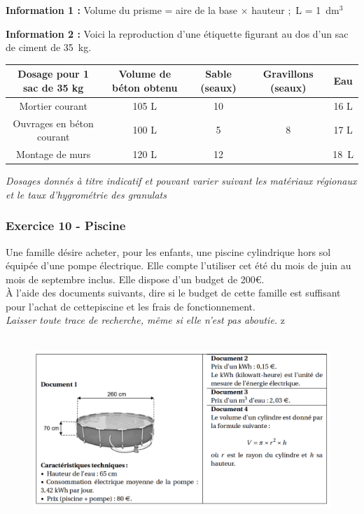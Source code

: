\documentclass[11pt]{article}
\begin{document}
\textbf{Information 1 :} Volume du prisme = aire de la base $\times$ hauteur ;~L = 1~dm$^3$

\textbf{Information 2 :} Voici la reproduction d'une étiquette figurant au dos d'un sac de ciment
de 35~kg.

\begin{center}
  \begin{tabular}{|c|c|c|c|c|}  \hline
    Dosage pour 1 sac de 35 kg	&Volume de béton obtenu	&Sable (seaux)	&Gravillons (seaux)	&Eau\\ \hline
    Mortier courant 			&105 L					&10				&					&16 L\\ \hline
    Ouvrages en béton courant	&100 L					&5				&8 					&17 L\\ \hline
    Montage de murs 			&120 L 					&12				&					&18~L\\ \hline
  \end{tabular}
\end{center}
\textit{Dosages donnés à titre indicatif et pouvant varier suivant les matériaux régionaux et le taux d'hygrométrie des granulats}

\subsubsection*{Exercice 10 - Piscine}

Une famille désire acheter, pour les enfants, une piscine cylindrique hors sol équipée d’une pompe électrique. Elle compte l’utiliser cet été du mois de juin au mois de septembre inclus. Elle dispose d’un budget de 200\euro. \\
À l’aide des documents suivants, dire si le budget de cette famille est suffisant pour l’achat de cettepiscine et les frais de fonctionnement. \\
\textit{Laisser toute trace de recherche, même si elle n’est pas aboutie.}
z
\begin{figure}[H]
      \centering
      \includegraphics[width=0.8\linewidth]{3x3-volumes-1/sources/piscine.png}
\end{figure}
\end{document}
